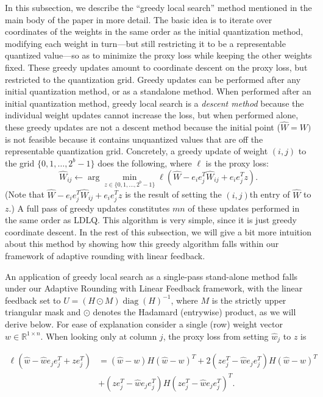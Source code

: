 In this subsection, we describe the ``greedy local search'' method mentioned in the main body of the paper in more detail. The basic idea is to iterate over coordinates of the weights in the same order as the initial quantization method, modifying each weight in turn---but still restricting it to be a representable quantized value---so as to minimize the proxy loss while keeping the other weights fixed. These greedy updates amount to coordinate descent on the proxy loss, but restricted to the quantization grid. Greedy updates can be performed after any initial quantization method, or as a standalone method. When performed after an initial quantization method, greedy local search is a \emph{descent method} because the individual weight updates cannot increase the loss, but when performed alone, these greedy updates are not a descent method because the initial point ($\hat W = W)$ is not feasible because it contains unquantized values that are off the representable quantization grid. Concretely, a greedy update of weight $(i,j)$ to the grid $\{0,1,\ldots,2^b - 1\}$ does the following, where $\ell$ is the proxy loss:
\[
    \hat W_{ij} \gets \arg \min_{z \in \{0,1,\ldots,2^b - 1\}} \ell(\hat W - e_i e_j^T \hat W_{ij} + e_i e_j^T z).
\]
(Note that $\hat W - e_i e_j^T \hat W_{ij} + e_i e_j^T z$ is the result of setting the $(i,j)$th entry of $\hat W$ to $z$.) A full pass of greedy updates constitutes $mn$ of these updates performed in the same order as LDLQ. This algorithm is very simple, since it is just greedy coordinate descent. In the rest of this subsection, we will give a bit more intuition about this method by showing how this greedy algorithm falls within our framework of adaptive rounding with linear feedback.

An application of greedy local search as a single-pass stand-alone method falls under our Adaptive Rounding with Linear Feedback framework, with the linear feedback set to $U = (H \odot M) \operatorname{diag}(H)^{-1}$, where $M$ is the strictly upper triangular mask and $\odot$ denotes the Hadamard (entrywise) product, as we will derive below. For ease of explanation consider a single (row) weight vector $w \in \mathbb{R}^{1 \times n}$. When looking only at column $j$, the proxy loss from setting $\hat w_j$ to $z$ is

\begin{align*}
    \ell(\hat w - \hat w e_j e_j^T + z e_j^T) &= 
    (\hat w - w) H (\hat w - w)^T + 2 (z e_j^T - \hat w e_j e_j^T) H (\hat w - w)^T
    \\&+
    (z e_j^T - \hat w e_j e_j^T) H (z e_j^T - \hat w e_j e_j^T)^T.
\end{align*}


